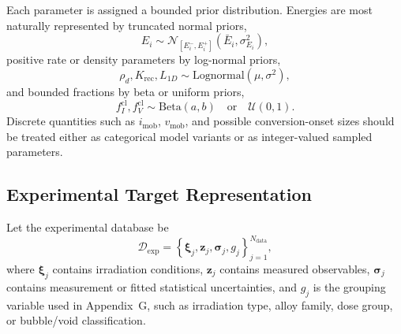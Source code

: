 Each parameter is assigned a bounded prior distribution.  Energies are most
naturally represented by truncated normal priors,
\begin{equation}
    E_i \sim \mathcal{N}_{[E_i^{-},E_i^{+}]}
    \left(\bar E_i,\sigma_{E_i}^2\right),
\end{equation}
positive rate or density parameters by log-normal priors,
\begin{equation}
    \rho_d,
    K_{\mathrm{rec}},
    L_{1D}
    \sim
    \mathrm{Lognormal}(\mu,\sigma^2),
\end{equation}
and bounded fractions by beta or uniform priors,
\begin{equation}
    f_I^{\mathrm{cl}}, f_V^{\mathrm{cl}}
    \sim
    \mathrm{Beta}(a,b)
    \quad\mathrm{or}\quad
    \mathcal{U}(0,1).
\end{equation}
Discrete quantities such as $i_{\mathrm{mob}}$, $v_{\mathrm{mob}}$, and possible
conversion-onset sizes should be treated either as categorical model variants
or as integer-valued sampled parameters.

\subsection{Experimental Target Representation}
\label{app:dt_targets}

Let the experimental database be
\begin{equation}
    \mathcal{D}_{\mathrm{exp}}
    =
    \left\{
      \boldsymbol{\xi}_j,
      \mathbf{z}_j,
      \boldsymbol{\sigma}_j,
      g_j
    \right\}_{j=1}^{N_{\mathrm{data}}},
\end{equation}
where $\boldsymbol{\xi}_j$ contains irradiation conditions, $\mathbf{z}_j$
contains measured observables, $\boldsymbol{\sigma}_j$ contains measurement
or fitted statistical uncertainties, and $g_j$ is the grouping variable used in
Appendix~G, such as irradiation type, alloy family, dose group, or
bubble/void classification.

